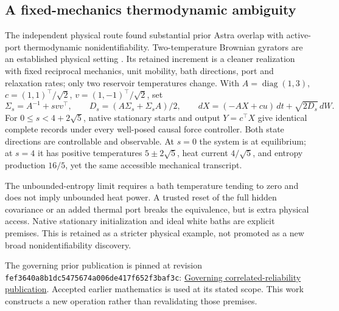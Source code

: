 \subsection{A fixed-mechanics thermodynamic ambiguity}
The independent physical route found substantial prior Astra overlap with
active-port thermodynamic nonidentifiability. Two-temperature Brownian
gyrators are an established physical setting \cite{filliger}. Its retained increment is a
cleaner realization with fixed reciprocal mechanics, unit mobility, bath
directions, port and relaxation rates; only two reservoir temperatures
change. With $A=\operatorname{diag}(1,3)$,
$c=(1,1)^\top/\sqrt2$, $v=(1,-1)^\top/\sqrt2$, set
\[
\Sigma_s=A^{-1}+svv^\top,\qquad
D_s=(A\Sigma_s+\Sigma_sA)/2,\qquad
dX=(-AX+cu)\,dt+\sqrt{2D_s}\,dW.
\]
For $0\le s<4+2\sqrt5$, native stationary starts and output $Y=c^\top X$
give identical complete records under every well-posed causal force
controller. Both state directions are controllable and observable.
At $s=0$ the system is at equilibrium; at $s=4$ it has positive temperatures
$5\pm2\sqrt5$, heat current $4/\sqrt5$, and entropy production $16/5$,
yet the same accessible mechanical transcript.

The unbounded-entropy limit requires a bath temperature tending to zero
and does not imply unbounded heat power. A trusted reset of the full hidden
covariance or an added thermal port breaks the equivalence, but is extra
physical access. Native stationary initialization and ideal white baths
are explicit premises. This is retained as a stricter physical example,
not promoted as a new broad nonidentifiability discovery.

The governing prior publication is pinned at revision
\texttt{fef3640a8b1dc5475674a006de417f652f3baf3c}:
\href{https://github.com/harjassand/astra-research-knowledge/tree/fef3640a8b1dc5475674a006de417f652f3baf3c/research/returns/2026-11-05-p3-correlated-reliability}{Governing correlated-reliability publication}.
Accepted earlier mathematics is used at its stated scope. This work constructs a new operation rather than revalidating those premises.

